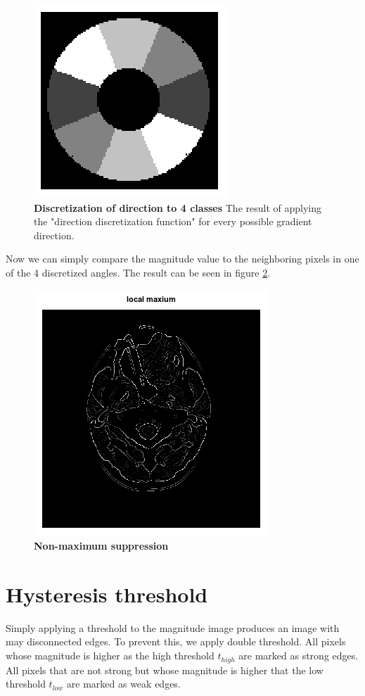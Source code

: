\documentclass[fleqn,moreauthors,10pt]{ds_report}
\begin{document}
\begin{figure}[h]\centering
	\includegraphics[width=0.4\linewidth]{angle.png}
	\caption{\textbf{Discretization of direction to 4 classes} The result of applying the "direction discretization function" for every possible gradient direction.}
	\label{fig:angle}
\end{figure}

Now we can simply compare the magnitude value to the neighboring pixels in one of the 4 discretized angles. The result can be seen in figure \ref{fig:local_max}.

\begin{figure}[h]\centering
	\includegraphics[width=0.7\linewidth]{local_max.png}
	\caption{\textbf{Non-maximum suppression}}
	\label{fig:local_max}
\end{figure}

\section*{Hysteresis threshold}

Simply applying a threshold to the magnitude image produces an image with may disconnected edges. To prevent this, we apply double threshold. All pixels whose magnitude is higher as the high threshold $t_{high}$ are marked as strong edges. All pixels that are not strong but whose magnitude is higher that the low threshold $t_{low}$ are marked as weak edges. 
\end{document}
